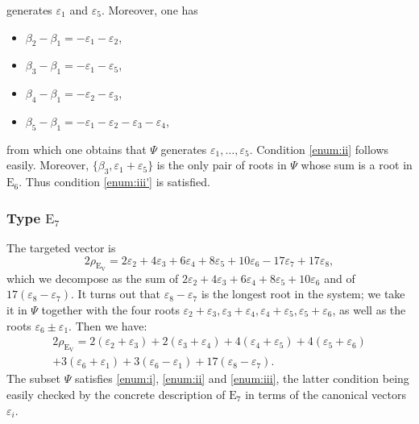 \documentclass[JEP,XML,SOM,Unicode,published]{cedram}
\theoremstyle{plain}
\theoremstyle{remark}
\theoremstyle{definition}
\begin{document}
generates $\varepsilon_1$ and $\varepsilon_5$. Moreover, one has
\begin{itemize}
\item[] $\beta_2 -\beta_1 = -\varepsilon_1 - \varepsilon_2$,
\item[] $\beta_3 -\beta_1 = -\varepsilon_1 - \varepsilon_5$,
\item[] $\beta_4 -\beta_1 = - \varepsilon_2 - \varepsilon_3$,
\item[] $\beta_5 -\beta_1 = -\varepsilon_1 - \varepsilon_2 - \varepsilon_3 - \varepsilon_4$,
\end{itemize}
from which one obtains that $\Psi$ generates $\varepsilon_1, \dots, \varepsilon_5$. Condition \eqref{enum:ii} follows easily.
Moreover, $\{\beta_3, \varepsilon_1+\varepsilon_5\}$ is the only pair of roots in $\Psi$ whose sum is a root in $\mathrm{E}_6$.
Thus condition \eqref{enum:iii'} is satisfied.

\subsubsection*{Type $\mathrm{E}_7$
\cite[Planche VI, p.\,266]{BBK-Lie-4to6}}
The targeted vector is
\[
2 \rho_{\mathrm{E}_\mathrm{V}} = 2 \varepsilon_2 + 4 \varepsilon_3 + 6 \varepsilon_4 + 8 \varepsilon_5 + 10 \varepsilon_6 - 17 \varepsilon_7 + 17 \varepsilon_8,
\]
which we decompose as the sum of $2 \varepsilon_2 + 4 \varepsilon_3 + 6 \varepsilon_4 + 8 \varepsilon_5 + 10 \varepsilon_6$ and of $17(\varepsilon_8-\varepsilon_7)$.
It turns out that $\varepsilon_8-\varepsilon_7$ is the longest root in the system; we take it in $\Psi$ together with the four roots $\varepsilon_2+\varepsilon_3, \varepsilon_3+\varepsilon_4, \varepsilon_4+\varepsilon_5, \varepsilon_5+\varepsilon_6$, as well as the roots $\varepsilon_6 \pm \varepsilon_1$.
Then we have:
\begin{multline*}
2 \rho_{\mathrm{E}_\mathrm{V}}
= 2(\varepsilon_2+\varepsilon_3) + 2(\varepsilon_3+\varepsilon_4) + 4 (\varepsilon_4+\varepsilon_5) + 4(\varepsilon_5+\varepsilon_6)\\
+ 3 (\varepsilon_6+\varepsilon_1) + 3(\varepsilon_6-\varepsilon_1) + 17(\varepsilon_8-\varepsilon_7).
\end{multline*}
The subset $\Psi$ satisfies \eqref{enum:i}, \eqref{enum:ii} and \eqref{enum:iii}, the latter condition being easily checked by the concrete description of $\mathrm{E}_7$ in terms of the canonical vectors $\varepsilon_i$.
\end{document}
